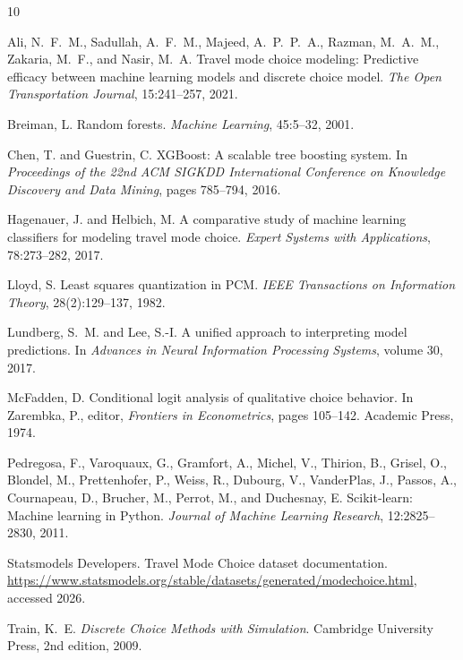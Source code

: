 \documentclass{article}
\begin{document}
\begin{thebibliography}{10}

Ali, N.~F.~M., Sadullah, A.~F.~M., Majeed, A.~P.~P.~A., Razman, M.~A.~M., Zakaria, M.~F., and Nasir, M.~A.
\newblock Travel mode choice modeling: Predictive efficacy between machine learning models and discrete choice model.
\newblock \emph{The Open Transportation Journal}, 15:241--257, 2021.

Breiman, L.
\newblock Random forests.
\newblock \emph{Machine Learning}, 45:5--32, 2001.

Chen, T. and Guestrin, C.
\newblock XGBoost: A scalable tree boosting system.
\newblock In \emph{Proceedings of the 22nd ACM SIGKDD International Conference on Knowledge Discovery and Data Mining}, pages 785--794, 2016.

Hagenauer, J. and Helbich, M.
\newblock A comparative study of machine learning classifiers for modeling travel mode choice.
\newblock \emph{Expert Systems with Applications}, 78:273--282, 2017.

Lloyd, S.
\newblock Least squares quantization in PCM.
\newblock \emph{IEEE Transactions on Information Theory}, 28(2):129--137, 1982.

Lundberg, S.~M. and Lee, S.-I.
\newblock A unified approach to interpreting model predictions.
\newblock In \emph{Advances in Neural Information Processing Systems}, volume 30, 2017.

McFadden, D.
\newblock Conditional logit analysis of qualitative choice behavior.
\newblock In Zarembka, P., editor, \emph{Frontiers in Econometrics}, pages 105--142. Academic Press, 1974.

Pedregosa, F., Varoquaux, G., Gramfort, A., Michel, V., Thirion, B., Grisel, O., Blondel, M., Prettenhofer, P., Weiss, R., Dubourg, V., VanderPlas, J., Passos, A., Cournapeau, D., Brucher, M., Perrot, M., and Duchesnay, E.
\newblock Scikit-learn: Machine learning in Python.
\newblock \emph{Journal of Machine Learning Research}, 12:2825--2830, 2011.

Statsmodels Developers.
\newblock Travel Mode Choice dataset documentation.
\newblock \url{https://www.statsmodels.org/stable/datasets/generated/modechoice.html}, accessed 2026.

Train, K.~E.
\newblock \emph{Discrete Choice Methods with Simulation}.
\newblock Cambridge University Press, 2nd edition, 2009.

\end{thebibliography}
\end{document}
